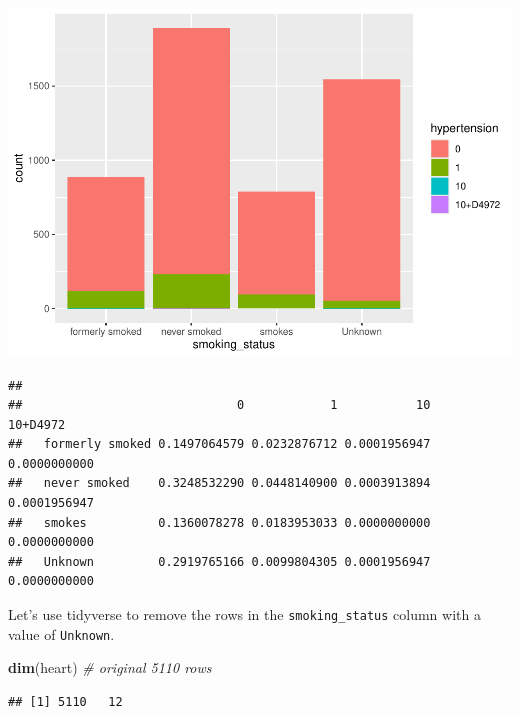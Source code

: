 \documentclass[
]{book}
\newenvironment{Shaded}{\begin{snugshade}}{\end{snugshade}}
\newcommand{\CommentTok}[1]{\textcolor[rgb]{0.56,0.35,0.01}{\textit{#1}}}
\newcommand{\FunctionTok}[1]{\textcolor[rgb]{0.13,0.29,0.53}{\textbf{#1}}}
\newcommand{\NormalTok}[1]{#1}
\newcommand{\SpecialCharTok}[1]{\textcolor[rgb]{0.81,0.36,0.00}{\textbf{#1}}}
\begin{document}
\includegraphics{_main_files/figure-latex/unnamed-chunk-76-1.pdf}

\begin{Shaded}
\end{Shaded}

\begin{verbatim}
##                  
##                              0            1           10     10+D4972
##   formerly smoked 0.1497064579 0.0232876712 0.0001956947 0.0000000000
##   never smoked    0.3248532290 0.0448140900 0.0003913894 0.0001956947
##   smokes          0.1360078278 0.0183953033 0.0000000000 0.0000000000
##   Unknown         0.2919765166 0.0099804305 0.0001956947 0.0000000000
\end{verbatim}

Let's use tidyverse to remove the rows in the \texttt{smoking\_status} column with a value of \texttt{Unknown}.

\begin{Shaded}
\begin{Highlighting}[]
\FunctionTok{dim}\NormalTok{(heart) }\CommentTok{\# original 5110 rows }
\end{Highlighting}
\end{Shaded}

\begin{verbatim}
## [1] 5110   12
\end{verbatim}
\end{document}

